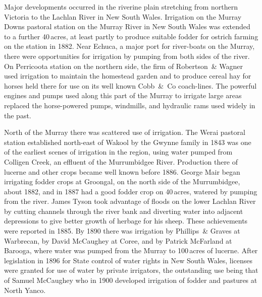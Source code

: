 Major developments occurred in the riverine plain stretching from
northern Victoria to the Lachlan River  in New
South Wales.  Irrigation on the Murray Downs pastoral station
 on the
Murray River  in New South Wales was extended to a
further 40\,acres, at least partly to produce suitable fodder for ostrich
farming on the station in 1882. Near Echuca,  a major
port for river-boats on the Murray, there were opportunities for
irrigation by pumping from both sides of the river.  On Perricoota
station  on the northern side, the firm of
Robertson~\& Wagner used irrigation to maintain the homestead garden
and to produce cereal hay for horses held there for use on its well
known Cobb~\&~Co   coach-lines. The powerful
engines and pumps used along this part of the Murray to irrigate large
areas replaced the horse-powered pumps, 
windmills, and hydraulic rams used widely in the
past.

North of the Murray there was scattered use of irrigation.  The Werai
pastoral station  established north-east of
Wakool  by the Gwynne family in 1843 was one of the
earliest scenes of irrigation in the region, using water pumped from
Colligen Creek,  an effluent of the Murrumbidgee
River.   Production there of lucerne
 and
other crops became well known before 1886.  George Mair  began irrigating fodder crops at Groongal,  on the
north side of the Murrumbidgee, about 1882, and in 1887 had a good
fodder crop on 40\,acres, watered by pumping from the river.  James Tyson
took advantage of floods on the lower Lachlan River
 by cutting
channels through the river bank and diverting water into adjacent
depressions to give better growth of herbage for his sheep. These
achievements were reported in 1885.  By 1890 there was irrigation by
Phillips~\& Graves at Warbrecan,  by David McCaughey
at Coree,  and by Patrick McFarland 
at Barooga,  where water was pumped from the Murray to
100\,acres of lucerne.  After legislation in 1896 for State control of
water rights in New South Wales, licenses were granted for use of
water by private irrigators, the outstanding use being that of Samuel
McCaughey  who in 1900 developed irrigation of
fodder and pastures at North Yanco. 

